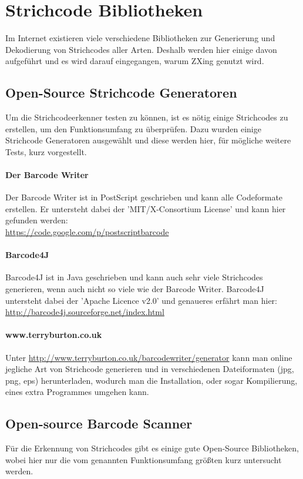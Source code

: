 \section{Strichcode Bibliotheken}
\writtenby{\dcauthornameriren}%
Im Internet existieren viele verschiedene Bibliotheken zur Generierung und Dekodierung von Strichcodes aller Arten. Deshalb werden hier einige davon aufgeführt und es wird darauf eingegangen, warum ZXing genutzt wird.


\subsection*{Open-Source Strichcode Generatoren}
Um die Strichcodeerkenner testen zu können, ist es nötig einige Strichcodes zu erstellen, um den Funktionsumfang zu überprüfen. Dazu wurden einige Strichcode Generatoren ausgewählt und diese werden hier, für mögliche weitere Tests, kurz vorgestellt.

\paragraph*{Der Barcode Writer}
Der Barcode Writer ist in PostScript geschrieben und kann alle Codeformate erstellen. Er untersteht dabei der 'MIT/X-Consortium License' und kann hier gefunden werden:\\ \url{https://code.google.com/p/postscriptbarcode}

\paragraph*{Barcode4J}
Barcode4J ist in Java geschrieben und kann auch sehr viele Strichcodes generieren, wenn auch nicht so viele wie der Barcode Writer. Barcode4J untersteht dabei der 'Apache Licence v2.0' und genaueres erfährt man hier:\\
\url{http://barcode4j.sourceforge.net/index.html}

\paragraph*{www.terryburton.co.uk}
Unter \url{http://www.terryburton.co.uk/barcodewriter/generator} kann man online jegliche Art von Strichcode generieren und in verschiedenen Dateiformaten (jpg, png, eps) herunterladen, wodurch man die Installation, oder sogar Kompilierung, eines extra Programmes umgehen kann.



\subsection*{Open-source Barcode Scanner}
Für die Erkennung von Strichcodes gibt es einige gute Open-Source Bibliotheken, wobei hier nur die vom genannten Funktionsumfang größten kurz untersucht werden.

